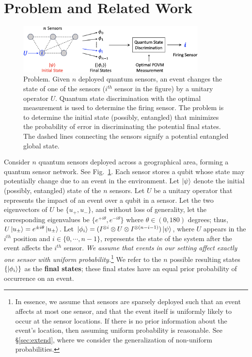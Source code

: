 \section{\bf \iso Problem and Related Work}
\label{sec:tqc_problem}

\begin{figure}[ht]
    \centering
    \includegraphics[width=0.85\textwidth]{chapters/tqc/figures/ISO.png}
    \caption{\iso Problem. Given $n$ deployed quantum sensors, an event changes the state of one of the sensors  ($i^{th}$ sensor in the figure) by a unitary operator $U$. Quantum state discrimination with the optimal measurement is used to determine the firing sensor. The \iso problem is to determine the initial state (possibly, entangled) that minimizes the probability of error in discriminating the potential final states. The dashed lines connecting the sensors signify a potential entangled global state.
    } 
    \label{fig:qsn}
\end{figure}

 Consider $n$ quantum sensors deployed across a geographical area, forming a quantum sensor network. See Fig.~\ref{fig:qsn}. 
Each sensor stores a qubit whose state may potentially change due to an event in the environment.
Let $\ket{\psi}$ denote the initial (possibly, entangled) state of the $n$ sensors.
Let $U$ be a unitary operator that represents the impact of an event over a qubit in a sensor.
Let the two eigenvectors 
of $U$ be $\{u_+, u_-\}$, and without loss of generality,
let the corresponding eigenvalues be $\{e^{+i\theta}, e^{-i\theta}\}$
where $\theta \in (0, 180)$ degrees;
thus, $U\ket{u_{\pm}}=e^{\pm i\theta}\ket{u_{\pm}}$.
Let $\ket{\phi_i} = (I^{\otimes i} \otimes U \otimes I^{\otimes (n-i-1)})\ket{\psi}$, 
where $U$ appears in the $i^{th}$ 
position and $i\in \{0, \cdots, n-1 \}$, 
represents the state of the system after the event affects the $i^{th}$ sensor. 
{\em We assume that events in our setting affect exactly one sensor with uniform probability.}\footnote{In essence, we assume that sensors are sparsely deployed such that
an event affects at most one sensor, and that the event itself is uniformly likely to occur at the
sensor locations. 
If there is no prior information about the event's location, then assuming uniform probability is reasonable.
See \S\ref{sec:extend}, where we consider the generalization of non-uniform probabilities.}  
We refer to the $n$ possible resulting states $\{\ket{\phi_i}\}$ as the {\bf final states}; these
final states have an equal prior probability of occurrence on an event.

